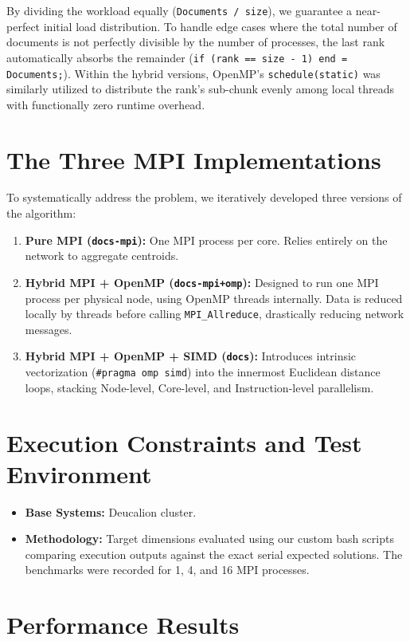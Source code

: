 \documentclass[12pt,a4paper]{article}
\begin{document}
By dividing the workload equally (\texttt{Documents / size}), we guarantee a near-perfect initial load distribution. To handle edge cases where the total number of documents is not perfectly divisible by the number of processes, the last rank automatically absorbs the remainder (\texttt{if (rank == size - 1) end = Documents;}). Within the hybrid versions, OpenMP's \texttt{schedule(static)} was similarly utilized to distribute the rank's sub-chunk evenly among local threads with functionally zero runtime overhead.

\section{The Three MPI Implementations}

To systematically address the problem, we iteratively developed three versions of the algorithm:
\begin{enumerate}
    \item \textbf{Pure MPI (\texttt{docs-mpi}):} One MPI process per core. Relies entirely on the network to aggregate centroids.
    \item \textbf{Hybrid MPI + OpenMP (\texttt{docs-mpi+omp}):} Designed to run one MPI process per physical node, using OpenMP threads internally. Data is reduced locally by threads before calling \texttt{MPI\_Allreduce}, drastically reducing network messages.
    \item \textbf{Hybrid MPI + OpenMP + SIMD (\texttt{docs}):} Introduces intrinsic vectorization (\texttt{\#pragma omp simd}) into the innermost Euclidean distance loops, stacking Node-level, Core-level, and Instruction-level parallelism.
\end{enumerate}

\section{Execution Constraints and Test Environment}
\begin{itemize}
    \item \textbf{Base Systems:} Deucalion cluster.
    \item \textbf{Methodology:} Target dimensions evaluated using our custom bash scripts comparing execution outputs against the exact serial expected solutions. The benchmarks were recorded for 1, 4, and 16 MPI processes.
\end{itemize}

\section{Performance Results}
\end{document}
